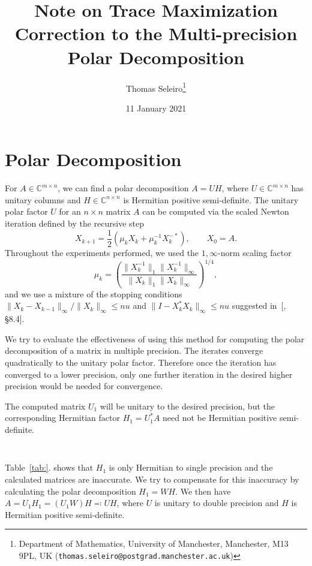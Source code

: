 \documentclass[10pt, A4paper]{article}
\newcommand{\mxn}{m \times n}
\newcommand{\nxn}{n \times n}
\begin{document}
\title{Note on Trace Maximization Correction to the Multi-precision
Polar Decomposition}
\author{Thomas Seleiro\thanks
	{Department of Mathematics, University of Manchester,
	Manchester, M13 9PL, UK
	(\texttt{thomas.seleiro@postgrad.manchester.ac.uk})}}
\date{11 January 2021}
\maketitle


\section{Polar Decomposition}

For $A \in \mathbb{C}^{\mxn}$, we can find a polar decomposition $A =
UH$, where $U \in \mathbb{C}^{\mxn}$ has unitary columns and $H \in
\mathbb{C}^{\nxn}$ is Hermitian positive semi-definite.
The unitary polar factor $U$ for an $\nxn$ matrix $A$ can be computed
via the scaled Newton iteration defined by the recursive step
$$X_{k+1} = \dfrac{1}{2} (\mu_k X_k + \mu_k^{-1} X_k^{-*}),
\qquad X_0 = A.$$
Throughout the experiments performed, we used the $1,\infty$-norm
scaling factor
$$\mu_k = \left( \dfrac{\|X_k^{-1}\|_1 \|X_k^{-1}\|_\infty}
{\|X_k\|_1 \|X_k\|_\infty}\right)^{1/4},$$
and we use a mixture of the stopping conditions
$\|X_k - X_{k-1}\|_\infty / \|X_k\|_\infty \leq nu$
and
$\|I - X_k^*X_k\|_\infty \leq nu$ suggested in~{[\citealp{high2008},
\S8.4].}

We try to evaluate the effectiveness of using this method for computing
the polar decomposition of a matrix in multiple precision.
The iterates converge quadratically to the unitary polar factor.
Therefore once the iteration has converged to a lower precision, only
one further iteration in the desired higher precision would be needed
for convergence.

The computed matrix $U_1$ will be unitary to the desired precision, but
the corresponding Hermitian factor $H_1 = U_1^*A$ need not be Hermitian
positive semi-definite.
\begin{table}
	\centering
	\begin{tabular}{cccc}
		\toprule

		\bottomrule
	\end{tabular}
	\caption{\label{}
		}
\end{table}
Table~\ref{tab:}. shows that $H_1$ is only Hermitian to single
precision and the calculated matrices are inaccurate.
We try to compensate for this inaccuracy by calculating the polar
decomposition $H_1 = WH$. We then have $A = U_1H_1 = (U_1W)H \eqqcolon
UH$, where $U$ is unitary to double precision and $H$ is Hermitian
positive semi-definite.
\end{document}
